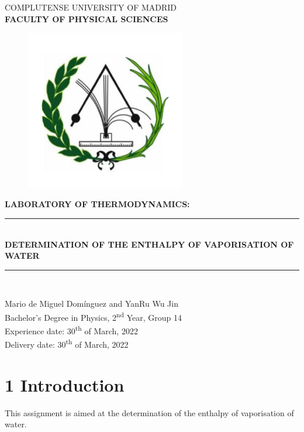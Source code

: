 \documentclass[a4paper, 12pt]{article}
\newcommand\blankpage{%
	\null
	\thispagestyle{empty}%
	\addtocounter{page}{-1}%
	\newpage}
\begin{document}
	\begin{titlepage}
		\centering
		\vfill
		\Large{COMPLUTENSE UNIVERSITY OF MADRID \\ \textbf{FACULTY OF PHYSICAL SCIENCES}}
		\vfill
		\begin{figure}[h!]
			\centering
			\includegraphics[height=7cm]{cumphysics}
		\end{figure}
		\vfill 
		\textbf{\Large{LABORATORY OF THERMODYNAMICS:}}
		\rule [5pt]{14cm}{2pt}\\
		\LARGE{\textbf{DETERMINATION OF THE ENTHALPY OF VAPORISATION OF WATER}} \\
		\rule [8pt]{14cm}{2pt}\\
		\vfill
		\vfill
		\vfill
		\vfill
		
		\large{Mario de Miguel Domínguez and YanRu Wu Jin\\ Bachelor's Degree in Physics, 2\textsuperscript{nd} Year, Group 14\\ Experience date: 30\textsuperscript{th} of March, 2022\\ Delivery date: 30\textsuperscript{th} of March, 2022}
		\vfill
		\vfill
		\vfill
		\vfill
		
		\afterpage{\blankpage}
	\end{titlepage}
	
	\makeatletter
	\thispagestyle{empty}
	\addtocounter{page}{-1}
	\let\latexl@section\l@section
	\def\l@section#1#2{\begingroup\let\numberline\@gobble\latexl@section{#1}{#2}\endgroup}
	\let\latexl@subsection\l@subsection
	\def\l@subsection#1#2{\begingroup\let\numberline\@gobble\latexl@subsection{#1}{#2}\endgroup}
	\let\latexl@subsubsection\l@subsubsection
	\def\l@subsubsection#1#2{\begingroup\let\numberline\@gobble\latexl@subsubsection{#1}{#2}\endgroup}
	\makeatother
	\tableofcontents	
	\thispagestyle{empty}
	\afterpage{\blankpage}
	\newpage
	\section{1 Introduction}
	This assignment is aimed at the determination of the enthalpy of vaporisation of water.
\end{document}
